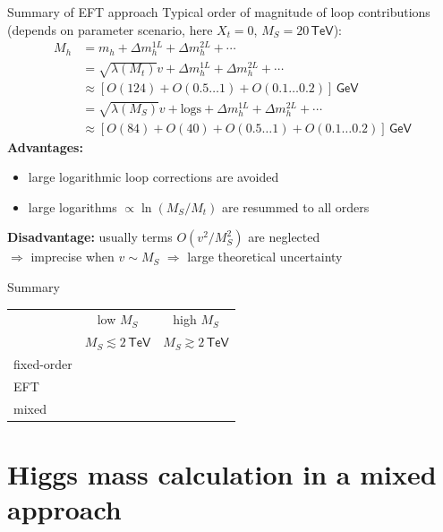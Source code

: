 \documentclass[hyperref={pdfpagelabels=false},ngerman]{beamer}
\newcommand{\cmark}{\ding{51}}%
\newcommand{\xmark}{\ding{55}}%
\newcommand{\eh}[1]{\,\mathsf{#1}}
\newcommand{\ok}{\textcolor{darkgreen}{\cmark}}
\newcommand{\notok}{\textcolor{red}{\xmark}}
\newcommand{\MS}{\ensuremath{M_S}}
\renewcommand{\emph}{\textbf}
\begin{document}
\begin{frame}{Summary of EFT approach}
  Typical order of magnitude of loop contributions (depends on
  parameter scenario, here $X_t = 0$, $\MS = 20\eh{TeV}$):
  \begin{align*}
    M_h &= m_h + \Delta m_h^{1L} + \Delta m_h^{2L} + \cdots \\
    &= \sqrt{\lambda(M_t)} v + \Delta m_h^{1L} + \Delta m_h^{2L} + \cdots \\
    &\approx [O(124) + O(0.5\ldots 1) + O(0.1\ldots 0.2)] \eh{GeV}\\
    &= \sqrt{\lambda(\MS)} v + \text{logs} + \Delta m_h^{1L} + \Delta m_h^{2L} + \cdots \\
    &\approx [O(84) + O(40) + O(0.5\ldots 1) + O(0.1\ldots 0.2)] \eh{GeV}
  \end{align*}
  \emph{Advantages:}
  \begin{itemize}
  \item large logarithmic loop corrections are avoided
  \item large logarithms $\propto\ln(M_S/M_t)$ are resummed to all orders
  \end{itemize}
  \emph{Disadvantage:} usually terms $O(v^2/M_S^2)$ are neglected \\
  $\Rightarrow$ imprecise when $v \sim \MS$
  $\Rightarrow$ large theoretical uncertainty
\end{frame}

\begin{frame}{Summary}
  \begin{center}
    \begin{tabular}{lcc}
      \toprule
                  & low $\MS$ & high $\MS$ \\
                  & $\MS \lesssim 2\eh{TeV}$ & $\MS \gtrsim 2\eh{TeV}$ \\
      \midrule
      fixed-order & \ok       & \notok     \\
      EFT         & \notok    & \ok        \\
      mixed       & \ok       & \ok        \\
      \bottomrule
    \end{tabular}
  \end{center}
\end{frame}


\section{Higgs mass calculation in a mixed approach}
\end{document}
